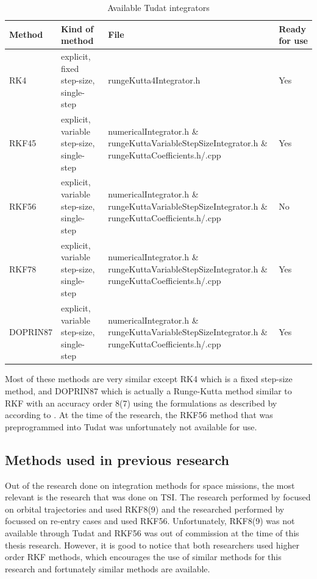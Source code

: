 \begin{table}[!ht]
\begin{center}
\caption{Available \ac{Tudat} integrators \citep{dirkx2016tudat}}
\label{tab:tudatIntegrators}
\begin{tabular}{|l|p{4cm}|p{8cm}|l|}
\hline 
\textbf{Method} & \textbf{Kind of method}		& \textbf{File} & \textbf{Ready for use} \\ \hline \hline
\ac{RK4} 	& explicit, fixed step-size, single-step & rungeKutta4Integrator.h & Yes  \\ \hline
\ac{RKF45} 	& explicit,  variable step-size, single-step & numericalIntegrator.h \& rungeKuttaVariableStepSizeIntegrator.h
\& rungeKuttaCoefficients.h/.cpp &  Yes \\ \hline
\acs{RKF56} 	& explicit, variable step-size, single-step & numericalIntegrator.h \& rungeKuttaVariableStepSizeIntegrator.h
\& rungeKuttaCoefficients.h/.cpp & No  \\ \hline
\ac{RKF78} &	explicit, variable step-size, single-step & numericalIntegrator.h \& rungeKuttaVariableStepSizeIntegrator.h
\& rungeKuttaCoefficients.h/.cpp &  Yes \\ \hline
\acs{DOPRIN87} 	& explicit, variable step-size, single-step & numericalIntegrator.h \& rungeKuttaVariableStepSizeIntegrator.h
\& rungeKuttaCoefficients.h/.cpp & Yes  \\ \hline
 	
 		
\end{tabular}
\end{center}
\end{table}

Most of these methods are very similar except \ac{RK4} which is a fixed step-size method, and \ac{DOPRIN87} which is actually a Runge-Kutta method similar to \ac{RKF} with an accuracy order 8(7) using the formulations as described by \cite{prince1981high} according to \cite{weeks2007comparison}. At the time of the research, the \ac{RKF56} method that was preprogrammed into \ac{Tudat} was unfortunately not available for use.

\subsection{Methods used in previous research}
\label{subsec:methodsUsedInPreviousResearch}
Out of the research done on integration methods for space missions, the most relevant is the research that was done on \ac{TSI}. The research performed by \cite{scott2008high} focused on orbital trajectories and used RKF8(9) and the researched performed by \cite{bergsma2016application} focussed on re-entry cases and used \ac{RKF56}. Unfortunately, RKF8(9) was not available through \ac{Tudat} and \ac{RKF56} was out of commission at the time of this thesis research. However, it is good to notice that both researchers used higher order RKF methods, which encourages the use of similar methods for this research and fortunately similar methods are available.

